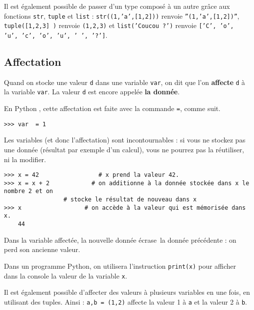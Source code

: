 Il est également possible de passer d'un type composé à un autre grâce aux fonctions \texttt{str}, 
\texttt{tuple} et \texttt{list} : \texttt{str((1,'a',[1,2]))} renvoie \texttt{''(1,'a',[1,2])''}, 
\texttt{tuple([1,2,3] )} renvoie \texttt{(1,2,3)} et \texttt{list('Coucou ?')} renvoie 
\texttt{['C', 'o', 'u', 'c', 'o', 'u', ' ', '?']}.

\subsection{Affectation}

Quand on stocke une valeur \texttt{d} dans une variable \texttt{var}, on dit que l'on 
\textbf{affecte} \texttt{d} à la variable \texttt{var}. La valeur
\texttt{d} est encore appelée \textbf{la donnée}.

En Python , cette affectation est faite avec la commande \texttt{=}, comme suit.  

\begin{lstlisting}
>>> var  = 1
\end{lstlisting}


Les variables (et donc l'affectation) sont incontournables : si vous ne stockez pas une donnée 
(résultat par exemple d'un calcul), vous ne pourrez pas la réutiliser, ni la modifier.

\begin{lstlisting}
>>> x = 42                 # x prend la valeur 42.
>>> x = x + 2	         # on additionne à la donnée stockée dans x le nombre 2 et on 
                 # stocke le résultat de nouveau dans x 
>>> x                  # on accède à la valeur qui est mémorisée dans x.
	44
\end{lstlisting}

Dans la variable affectée, la nouvelle donnée \og écrase\fg\ la donnée précédente : on perd son 
ancienne valeur.

Dans un programme Python, on utilisera l'instruction \texttt{print(x)}
pour afficher dans la console la valeur de la variable \texttt{x}.

Il est également possible d'affecter des valeurs à plusieurs variables en une fois, en utilisant 
des tuples. Ainsi : \texttt{a,b = (1,2)} affecte la valeur 1 à \texttt{a} et la valeur 2 à 
\texttt{b}.


